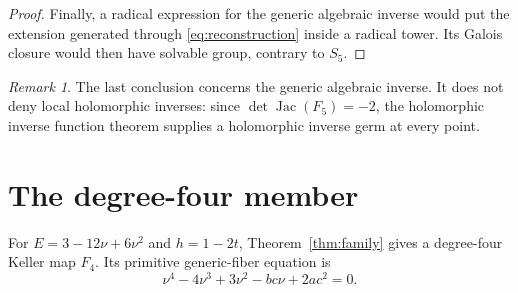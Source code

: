 \documentclass[11pt]{amsart}
\theoremstyle{remark}
\newtheorem{remark}[theorem]{Remark}
\newcommand{\Jac}{\operatorname{Jac}}
\begin{document}
\begin{proof}
Finally, a radical expression for the generic algebraic inverse would put the extension generated through \eqref{eq:reconstruction} inside a radical tower.  Its Galois closure would then have solvable group, contrary to $S_5$.
\end{proof}

\begin{remark}
The last conclusion concerns the generic algebraic inverse.  It does not deny local holomorphic inverses: since $\det\Jac(F_5)=-2$, the holomorphic inverse function theorem supplies a holomorphic inverse germ at every point.
\end{remark}

\section{The degree-four member}
For $E=3-12\nu+6\nu^2$ and $h=1-2t$, Theorem~\ref{thm:family} gives a degree-four Keller map $F_4$.  Its primitive generic-fiber equation is
\begin{equation}\label{eq:quartic}
 \nu^4-4\nu^3+3\nu^2-bc\nu+2ac^2=0.
\end{equation}
\end{document}
